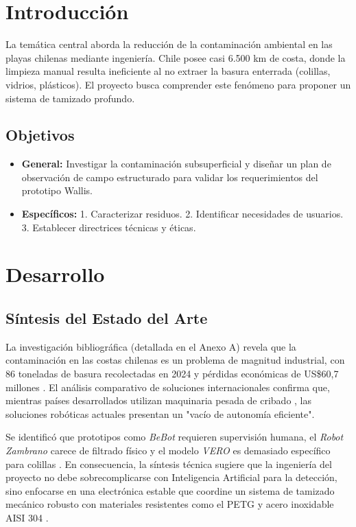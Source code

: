 \documentclass[12pt]{article}
\begin{document}
\section{Introducción}
La temática central aborda la reducción de la contaminación ambiental en las playas chilenas mediante ingeniería. Chile posee casi 6.500 km de costa, donde la limpieza manual resulta ineficiente al no extraer la basura enterrada (colillas, vidrios, plásticos). El proyecto busca comprender este fenómeno para proponer un sistema de tamizado profundo.

\subsection{Objetivos}
\begin{itemize}
    \item \textbf{General:} Investigar la contaminación subsuperficial y diseñar un plan de observación de campo estructurado para validar los requerimientos del prototipo Wallis.
    \item \textbf{Específicos:} 1. Caracterizar residuos. 2. Identificar necesidades de usuarios. 3. Establecer directrices técnicas y éticas.
\end{itemize}

\section{Desarrollo}

\subsection{Síntesis del Estado del Arte}
La investigación bibliográfica (detallada en el Anexo A) revela que la contaminación en las costas chilenas es un problema de magnitud industrial, con 86 toneladas de basura recolectadas en 2024 y pérdidas económicas de US\$60,7 millones \parencite{(Oceana, 2026)}. El análisis comparativo de soluciones internacionales confirma que, mientras países desarrollados utilizan maquinaria pesada de cribado \parencite{(Beachtech, 2020)}, las soluciones robóticas actuales presentan un "vacío de autonomía eficiente".

Se identificó que prototipos como \textit{BeBot} requieren supervisión humana, el \textit{Robot Zambrano} carece de filtrado físico y el modelo \textit{VERO} es demasiado específico para colillas \parencite{(Publimetro, 2024)}. En consecuencia, la síntesis técnica sugiere que la ingeniería del proyecto no debe sobrecomplicarse con Inteligencia Artificial para la detección, sino enfocarse en una electrónica estable que coordine un sistema de tamizado mecánico robusto con materiales resistentes como el PETG y acero inoxidable AISI 304 \parencite{(garcia, 2021)}.
\end{document}
